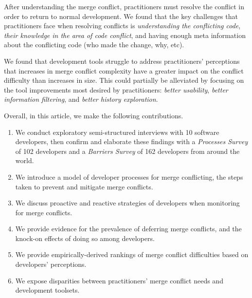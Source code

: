 After understanding the merge conflict, practitioners must resolve the conflict in order to return to normal development.
We found that the key challenges that practitioners face when resolving conflicts is \textit{understanding the conflicting code}, \textit{their knowledge in the area of code conflict}, and having enough meta information about the conflicting code (who made the change, why, etc).

We found that development tools struggle to address practitioners' perceptions that increases in merge conflict complexity have a greater impact on the conflict difficulty  than increases in size.
This could partially be alleviated by focusing on the tool improvements most desired by practitioners: \textit{better usability}, \textit{better information filtering}, and \textit{better history exploration}.


Overall, in this article, we make the following contributions.
\begin{enumerate}
\item We conduct exploratory semi-structured interviews with 10 software developers, then confirm and elaborate these findings with a \textit{Processes Survey} of 102 developers and a \textit{Barriers Survey} of 162 developers from around the world.
\item We introduce a model of developer processes for merge conflicting, the steps taken to prevent and mitigate merge conflicts.
\item We discuss proactive and reactive strategies of developers when monitoring for merge conflicts.
\item We provide evidence for the prevalence of deferring merge conflicts, and the knock-on effects of doing so among developers.
\item We provide empirically-derived rankings of merge conflict difficulties based on developers' perceptions.
\item We expose disparities between practitioners' merge conflict needs and development toolsets.
\end{enumerate}